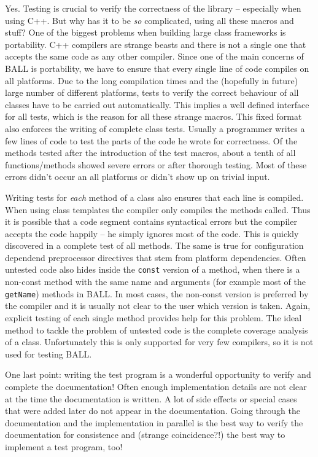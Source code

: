 \documentclass[a4]{article}
\begin{document}
Yes. Testing is crucial to verify the correctness of the library -- especially when
using C++. But why has it to be {\em so} complicated, using all these macros
and stuff? One of the biggest problems when building large class frameworks is
portability. C++ compilers are strange beasts and there is not a single one
that accepts the same code as any other compiler. Since one of the main
concerns of BALL is portability, we have to ensure that every single line of
code compiles on all platforms. Due to the long compilation times and the
(hopefully in future) large number of different platforms, tests to verify the
correct behaviour of all classes have to be carried out automatically. This
implies a well defined interface for all tests, which is the reason for all
these strange macros. This fixed format also enforces the writing of complete
class tests. Usually a programmer writes a few lines of code to test the parts
of the code he wrote for correctness. Of the methods tested after the
introduction of the test macros, about a tenth of all functions/methods showed
severe errors or after thorough testing. Most of these errors didn't occur an
all platforms or didn't show up on trivial input.

Writing tests for {\em each} method of a class also ensures that each line is
compiled. When using class templates the compiler only compiles the methods
called. Thus it is possible that a code segment contains syntactical errors
but the compiler accepts the code happily -- he simply ignores most of the
code. This is quickly discovered in a complete test of all methods. The same
is true for configuration dependend preprocessor directives that stem from
platform dependencies. Often untested code also hides inside the {\tt const}
version of a method, when there is a non-const method with the same name and
arguments (for example most of the {\tt getName}) methods in BALL. In most
cases, the non-const version is preferred by the compiler and it is usually
not clear to the user which version is taken. Again, explicit testing of each
single method provides help for this problem.
The ideal method to tackle the problem of untested code is the complete
coverage analysis of a class. Unfortunately this is only supported for very
few compilers, so it is not used for testing BALL.

One last point: writing the
test program is a wonderful opportunity to verify and complete the
documentation! Often enough implementation details are not clear at the time
the documentation is written. A lot of side effects or special cases that were
added later do not appear in the documentation. Going through the
documentation and the implementation in parallel is the best way to verify the
documentation for consistence and (strange coincidence?!) the best way to
implement a test program, too!
\end{document}
